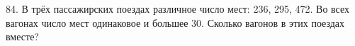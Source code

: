84. В трёх пассажирских поездах различное число мест: 236, 295, 472. Во всех вагонах число мест одинаковое и большее 30. Сколько вагонов в этих поездах вместе?\\

